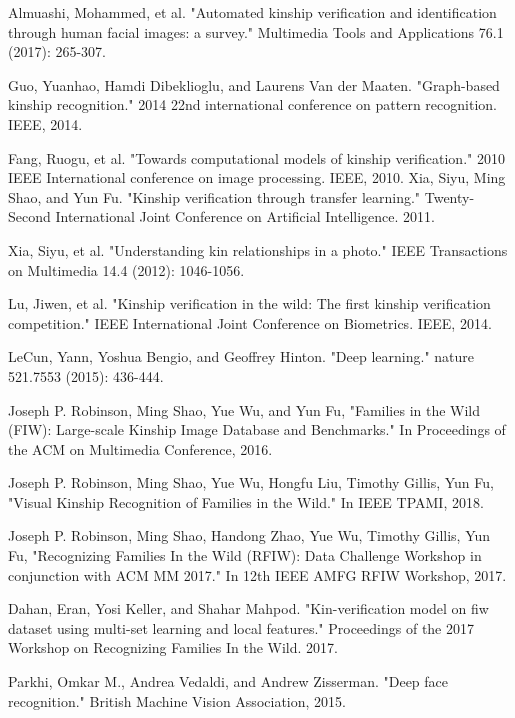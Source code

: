 \documentclass[a4paper, 10pt, conference]{ieeeconf}      %
\begin{document}
\begin{thebibliography}{99}
\balance

Almuashi, Mohammed, et al. "Automated kinship verification and identification through human facial images: a survey." Multimedia Tools and Applications 76.1 (2017): 265-307.

Guo, Yuanhao, Hamdi Dibeklioglu, and Laurens Van der Maaten. "Graph-based kinship recognition." 2014 22nd international conference on pattern recognition. IEEE, 2014.

Fang, Ruogu, et al. "Towards computational models of kinship verification." 2010 IEEE International conference on image processing. IEEE, 2010.
Xia, Siyu, Ming Shao, and Yun Fu. "Kinship verification through transfer learning." Twenty-Second International Joint Conference on Artificial Intelligence. 2011.

Xia, Siyu, et al. "Understanding kin relationships in a photo." IEEE Transactions on Multimedia 14.4 (2012): 1046-1056.

Lu, Jiwen, et al. "Kinship verification in the wild: The first kinship verification competition." IEEE International Joint Conference on Biometrics. IEEE, 2014.

LeCun, Yann, Yoshua Bengio, and Geoffrey Hinton. "Deep learning." nature 521.7553 (2015): 436-444.

Joseph P. Robinson, Ming Shao, Yue Wu, and Yun Fu, "Families in the Wild (FIW): Large-scale Kinship Image Database and Benchmarks." In Proceedings of the ACM on Multimedia Conference, 2016.

Joseph P. Robinson, Ming Shao, Yue Wu, Hongfu Liu, Timothy Gillis, Yun Fu, "Visual Kinship Recognition of Families in the Wild." In IEEE TPAMI, 2018.

Joseph P. Robinson, Ming Shao, Handong Zhao, Yue Wu, Timothy Gillis, Yun Fu, "Recognizing Families In the Wild (RFIW): Data Challenge Workshop in conjunction with ACM MM 2017." In 12th IEEE AMFG RFIW Workshop, 2017.

Dahan, Eran, Yosi Keller, and Shahar Mahpod. "Kin-verification model on fiw dataset using multi-set learning and local features." Proceedings of the 2017 Workshop on Recognizing Families In the Wild. 2017.

Parkhi, Omkar M., Andrea Vedaldi, and Andrew Zisserman. "Deep face recognition." British Machine Vision Association, 2015.


\end{thebibliography}
\end{document}
